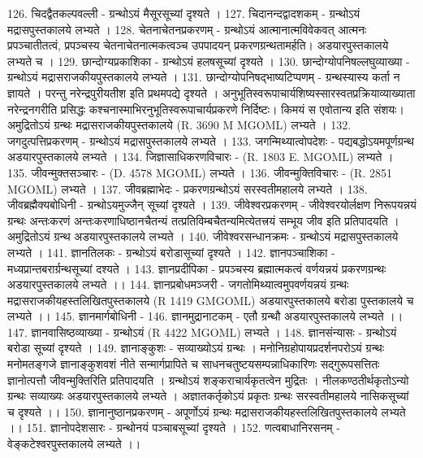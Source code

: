 126. चिदद्वैतकल्पवल्ली - ग्रन्थोऽयं मैसूरसूच्यां दृश्यते ।
127. चिदानन्दद्वादशकम् - ग्रन्थोऽयं मद्रासपुस्तकालये लभ्यते । 
128. चेतनाचेतनप्रकरणम् - ग्रन्थोऽयं आत्मानात्मविवेकवत् आत्मनः प्रपञ्चातीतत्वं, प्रपञ्चस्य चेतनाचेतनात्मकत्वञ्च उपपादयन् प्रकरणग्रन्थतामर्हति। अडयारपुस्तकालये लभ्यते च ।
129. छान्दोग्यप्रकाशिका - ग्रन्थोऽयं हलषसूच्यां दृश्यते । 
130. छान्दोग्योपनिषल्लघुव्याख्या - ग्रन्थोऽयं मद्रासराजकीयपुस्तकालये लभ्यते । 
131. छान्दोग्योपनिषद्भाष्यटिप्पणम् - ग्रन्थस्यास्य कर्ता न ज्ञायते । परन्तु नरेन्द्रपुरीयतीश इति प्रथमपद्ये दृश्यते । अनुभूतिस्वरूपाचार्यशिष्यस्सारस्वतप्रक्रियाव्याख्याता नरेन्द्रनगरीति प्रसिद्धः कश्चनास्माभिरनुभूतिस्वरूपाचार्यप्रकरणे निर्दिष्टः। किमयं स एवोतान्य इति संशयः। अमुद्रितोऽयं ग्रन्थः मद्रासराजकीयपुस्तकालये (R. 3690 M MGOML) लभ्यते । 
132. जगदुत्पत्तिप्रकरणम् - ग्रन्थोऽयं मद्रासपुस्तकालये लभ्यते ।
133. जगन्मिथ्यात्वोपदेशः - पद्यबद्धोऽयमपूर्णग्रन्थ अडयारपुस्तकालये लभ्यते । 
134. जिज्ञासाधिकरणविचारः - (R. 1803 E. MGOML) लभ्यते । 
135. जीवन्मुक्तसञ्चारः - (D. 4578 MGOML) लभ्यते । 
136. जीवन्मुक्तिविचारः - (R. 2851 MGOML) लभ्यते । 
137. जीवब्रह्माभेदः - प्रकरणग्रन्थोऽयं सरस्वतीमहालये लभ्यते । 
138. जीवब्रह्मैक्यबोधिनी - ग्रन्थोऽयमुज्जैन् सूच्यां दृश्यते । 
139. जीवेश्वरप्रकरणम् - जीवेश्वरयोर्लक्षण निरूपयन्नयं ग्रन्थः अन्तःकरणं अन्तःकरणाधिष्ठानचैतन्यं तत्प्रतिविम्बचैतन्यमित्येतत्त्रयं सम्भूय जीव इति प्रतिपादयति । अमुद्रितोऽयं ग्रन्थ अडयारपुस्तकालये लभ्यते । 
140. जीवेश्वरसन्धानक्रमः - ग्रन्थोऽयं मद्रासपुस्तकालये लभ्यते । 
141. ज्ञानतिलकः - ग्रन्थोऽयं बरोडासूच्यां दृश्यते । 
142. ज्ञानपञ्चाशिका - मध्यप्रान्तबरार्ग्रन्थसूच्यां दश्यते । 
143. ज्ञानप्रदीपिका - प्रपञ्चस्य ब्रह्मात्मकत्वं वर्णयन्नयं प्रकरणग्रन्थः अडयारपुस्तकालये लभ्यते ।।
144. ज्ञानप्रबोधमञ्जरी - जगतोमिथ्यात्वमुपवर्णयन्नयं ग्रन्थः मद्रासराजकीयहस्तलिखितपुस्तकालये (R 1419 GMGOML) अडयारपुस्तकालये बरोडा पुस्तकालये च लभ्यते ।। 
145. ज्ञानमार्गबोधिनी -
146. ज्ञानमुद्रानाटकम् - एतौ ग्रन्थौ अडयारपुस्तकालये लभ्यते ।।
147. ज्ञानवासिष्ठव्याख्या - ग्रन्थोऽयं (R 4422 MGOML) लभ्यते । 
148. ज्ञानसंन्यासः - ग्रन्थोऽयं  बरोडा सूच्यां दृश्यते । 
149. ज्ञानाङ्कुशः - सव्याख्योऽयं ग्रन्थः । मनोनिग्रहोपायप्रदर्शनपरोऽयं ग्रन्थः मनोमतङ्गजे ज्ञानाङ्कुशवशं नीते सन्मार्गप्रापिते च साधनचतुष्टयसम्पन्नाधिकारिणः सद्गुरूपसत्तितः ज्ञानोत्पत्तौ जीवन्मुक्तिरिति प्रतिपादयति । ग्रन्थोऽयं शङ्कराचार्यकृतत्वेन मुद्रितः । नीलकण्ठतीर्थकृतोऽन्यो ग्रन्थः सव्याख्यः अडयारपुस्तकालये लभ्यते । अज्ञातकर्तृकोऽयं प्रकृतः ग्रन्थः सरस्वतीमहालये नासिकसूच्यां च दृश्यते ।। 
150. ज्ञानानुष्ठानप्रकरणम् - अपूर्णोऽयं ग्रन्थः मद्रासराजकीयहस्तलिखितपुस्तकालये लभ्यते ।। 
151. ज्ञानोपदेशसारः - ग्रन्थोनयं पञ्चाबसूच्यां दृश्यते । 
152. णत्वबाधानिरसनम् - वेङ्कटेश्वरपुस्तकालये लभ्यते ।। 
